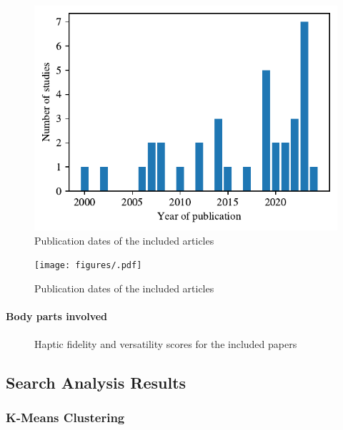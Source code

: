 \begin{figure}[htbp]
    \centering
    \includegraphics[width=\columnwidth]{figures/years.pdf} 
    \caption{Publication dates of the included articles}
    \label{fig:years}
\end{figure} 

\begin{figure}[htbp]
    \centering
    \texttt{[image: figures/.pdf]} 
    \caption{Publication dates of the included articles}
    \label{fig:body_parts_pie}
\end{figure} 


\paragraph{Body parts involved}


\begin{figure}[htbp]

\caption{Haptic fidelity and versatility scores for the included papers}
\label{fig:fidelity_plot}
\end{figure}


\subsection{Search Analysis Results}

\subsubsection{K-Means Clustering}

